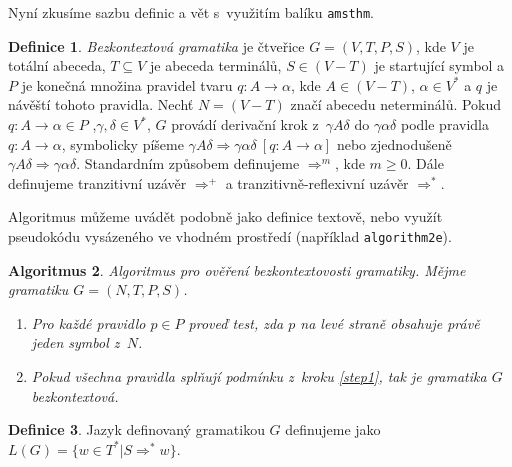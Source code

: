 \documentclass[11pt,a4paper,twocolumn]{article}
\theoremstyle{definition}
\newtheorem{definice}{Definice}[section]
\theoremstyle{plain}
\newtheorem{algoritmus}[definice]{Algoritmus}
\theoremstyle{plain}
\begin{document}
Nyní zkusíme sazbu definic a vět s~využitím balíku \texttt{amsthm}.
\begin{definice}\label{def1}
\textit{Bezkontextová gramatika} je čtveřice $ G = (V,T,P,S) $, kde $ V $ je totální abeceda,
$ T \subseteq V $ je abeceda terminálů, $ S \in (V-T) $ je startující symbol a $ P $ je konečná množina pravidel
tvaru $ q\colon A \rightarrow \alpha $, kde $ A \in (V-T)$, $ \alpha \in V^{*} $ a $ q $ je návěští tohoto pravidla. Nechť $ N = (V - T) $ značí abecedu neterminálů.
Pokud $ q\colon A \rightarrow \alpha \in P $ ,$ \gamma,\delta \in V^{*} $, $ G $ provádí derivační krok z~$ \gamma A\delta $ do $ \gamma\alpha\delta $ podle pravidla $ q\colon A \rightarrow \alpha $, symbolicky píšeme 
$ \gamma A\delta \Rightarrow \gamma\alpha\delta \  [ q\colon A \rightarrow \alpha ]$ nebo zjednodušeně $ \gamma A\delta \Rightarrow \gamma\alpha\delta $. Standardním způsobem definujeme $ \Rightarrow^{m} $, kde $ m\geq 0 $. Dále definujeme 
tranzitivní uzávěr $ \Rightarrow^{+} $ a tranzitivně-reflexivní uzávěr $ \Rightarrow^{*} $.
\end{definice}


Algoritmus můžeme uvádět podobně jako definice textově, nebo využít pseudokódu vysázeného ve vhodném prostředí (například \texttt{algorithm2e}).
\begin{algoritmus}\label{alg1}
Algoritmus pro ověření bezkontextovosti gramatiky. Mějme gramatiku $ G = (N,T,P,S) $.
\begin{enumerate}
 \item\label{step1}Pro každé pravidlo $ p \in P $ proveď test, zda $ p $ na levé straně obsahuje právě jeden symbol z~$ N $.
 \item Pokud všechna pravidla splňují podmínku z~kroku \ref{step1}, tak je gramatika $ G $ bezkontextová.
\end{enumerate}
\end{algoritmus}

\begin{definice}
Jazyk definovaný gramatikou $ G $ definujeme jako $ L(G) = \lbrace w \in T^{*}\vert S \Rightarrow^{*} w \rbrace $.
\end{definice}
\end{document}
